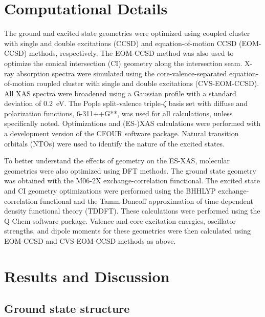 \documentclass[journal=jacsat,manuscript=article]{achemso}
\begin{document}
\section{Computational Details}

The ground and excited state geometries were optimized using coupled cluster with single and double excitations (CCSD)\cite{purvisFullCoupledCluster1982,scuseriaClosedshellCoupledCluster1987,leeEfficientClosedshellSingles1988} and equation-of-motion CCSD (EOM-CCSD)\cite{sekinoLinearResponseCoupledcluster1984,geertsenEquationofmotionCoupledclusterMethod1989,stanton1993equation} methods, respectively. The EOM-CCSD method was also used to optimize the conical intersection (CI) geometry along the intersection seam.\cite{KOGA1985371} X-ray absorption spectra were simulated using the core-valence-separated equation-of-motion coupled cluster with single and double excitations (CVS-EOM-CCSD).\cite{corianiCommunication2015} All XAS spectra were broadened using a Gaussian profile with a standard deviation of \SI{0.2}{eV}. The Pople split-valence triple-$\zeta$ basis set with diffuse and polarization functions, 6-311++G**,\cite{krishnan1980self,clark1983efficient} was used for all calculations, unless specifically noted. Optimizations and (ES-)XAS calculations were performed with a development version of the CFOUR software package.\cite{Matthews2020} Natural transition orbitals (NTOs) were used to identify the nature of the excited states.

To better understand the effects of geometry on the ES-XAS, molecular geometries were also optimized using DFT methods. The ground state geometry was obtained with the M06-2X exchange-correlation functional.\cite{Zhao2008} The excited state and CI geometry optimizations were performed using the BHHLYP exchange-correlation functional\cite{becke1993new} and the Tamm-Dancoff approximation of time-dependent density functional theory (TDDFT). These calculations were performed using the Q-Chem software package.\cite{doi:10.1080/00268976.2014.952696}
Valence and core excitation energies, oscillator strengths, and dipole moments for these geometries were then calculated using EOM-CCSD and CVS-EOM-CCSD methods as above.

\section{Results and Discussion}

\subsection{Ground state structure}
\end{document}
